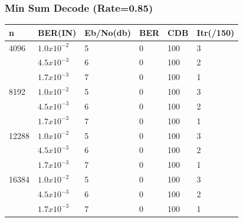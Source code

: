 \documentclass[xcolor=dvipsname]
{beamer}
\begin{document}
\begin{frame}[t] 
\frametitle{Min Sum Decode (Rate=0.85)}

\begin{table}[]
\centering
\begin{tabular}{|l|l|l|l|l|l|}
\hline
n     & BER(IN) & Eb/No(db) & BER & CDB & Itr(/150) \\ \hline
4096  & $1.0x10^{-2}$ & 5     & 0   & 100 & 3         \\
      & $4.5x10^{-3}$ & 6     & 0   & 100 & 2         \\ 
      & $1.7x10^{-3}$ & 7     & 0   & 100 & 1         \\ \hline
8192  & $1.0x10^{-2}$ & 5     & 0   & 100 & 3         \\ 
      & $4.5x10^{-3}$ & 6     & 0   & 100 & 2         \\ 
      & $1.7x10^{-3}$ & 7     & 0   & 100 & 1         \\ \hline
12288 & $1.0x10^{-2}$ & 5     & 0   & 100 & 3         \\ 
      & $4.5x10^{-3}$ & 6     & 0   & 100 & 2         \\ 
      & $1.7x10^{-3}$ & 7     & 0   & 100 & 1         \\ \hline
16384 & $1.0x10^{-2}$ & 5     & 0   & 100 & 3         \\ 
      & $4.5x10^{-3}$ & 6     & 0   & 100 & 2         \\ 
      & $1.7x10^{-3}$ & 7     & 0   & 100 & 1         \\ \hline
\end{tabular}
\end{table}
\end{frame}
\end{document}
